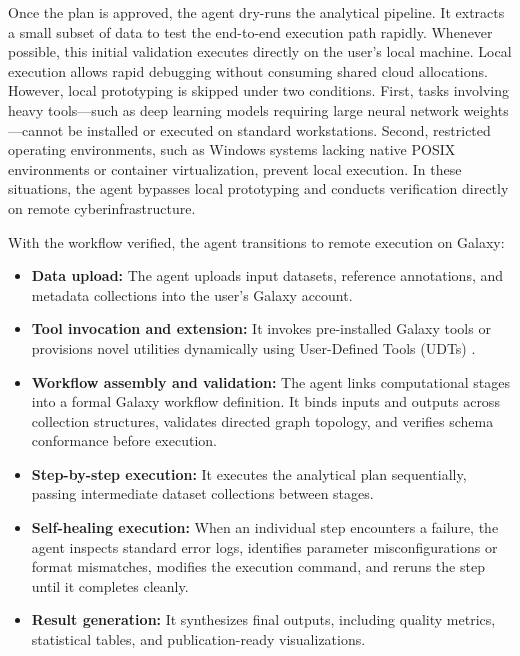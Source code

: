 \documentclass[11pt,letterpaper]{article}
\begin{document}
Once the plan is approved, the agent dry-runs the analytical pipeline. It extracts a small subset of data to test the end-to-end execution path rapidly. Whenever possible, this initial validation executes directly on the user's local machine. Local execution allows rapid debugging without consuming shared cloud allocations. However, local prototyping is skipped under two conditions. First, tasks involving heavy tools---such as deep learning models requiring large neural network weights---cannot be installed or executed on standard workstations. Second, restricted operating environments, such as Windows systems lacking native POSIX environments or container virtualization, prevent local execution. In these situations, the agent bypasses local prototyping and conducts verification directly on remote cyberinfrastructure.

With the workflow verified, the agent transitions to remote execution on Galaxy:
\begin{itemize}
    \item \textbf{Data upload:} The agent uploads input datasets, reference annotations, and metadata collections into the user's Galaxy account.
    \item \textbf{Tool invocation and extension:} It invokes pre-installed Galaxy tools or provisions novel utilities dynamically using User-Defined Tools (UDTs) \cite{galaxyudt2026}.
    \item \textbf{Workflow assembly and validation:} The agent links computational stages into a formal Galaxy workflow definition. It binds inputs and outputs across collection structures, validates directed graph topology, and verifies schema conformance before execution.
    \item \textbf{Step-by-step execution:} It executes the analytical plan sequentially, passing intermediate dataset collections between stages.
    \item \textbf{Self-healing execution:} When an individual step encounters a failure, the agent inspects standard error logs, identifies parameter misconfigurations or format mismatches, modifies the execution command, and reruns the step until it completes cleanly.
    \item \textbf{Result generation:} It synthesizes final outputs, including quality metrics, statistical tables, and publication-ready visualizations.
\end{itemize}
\end{document}
